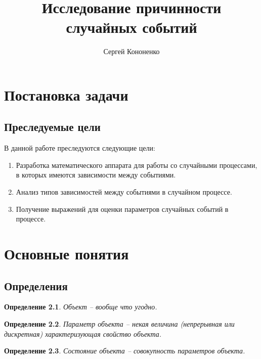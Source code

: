 \documentclass[a4paper,11pt]{report}
\title{Исследование причинности случайных событий}
\author{Сергей Кононенко}
\newtheorem{definition}{Определение}
\begin{document}
  \maketitle
  
  \tableofcontents
  
  \chapter{Постановка задачи}
  
    \section{Преследуемые цели}
    
      В данной работе преследуются следующие цели:
      
      \begin{enumerate}
      	\item Разработка математического аппарата для работы со случайными процессами, в которых имеются зависимости между событиями.
      	\item Анализ типов зависимостей между событиями в случайном процессе.
      	\item Получение выражений для оценки параметров случайных событий в процессе.
      \end{enumerate}
    
  \chapter{Основные понятия}
  
    \section{Определения}
    
      \begin{definition}
        Объект -- вообще что угодно.
      \end{definition}
    
      \begin{definition}
        Параметр объекта -- некая величина (непрерывная или дискретная) характеризующая свойство объекта.
      \end{definition}
    
      \begin{definition}
        Состояние объекта -- совокупность параметров объекта.
      \end{definition}
\end{document}
